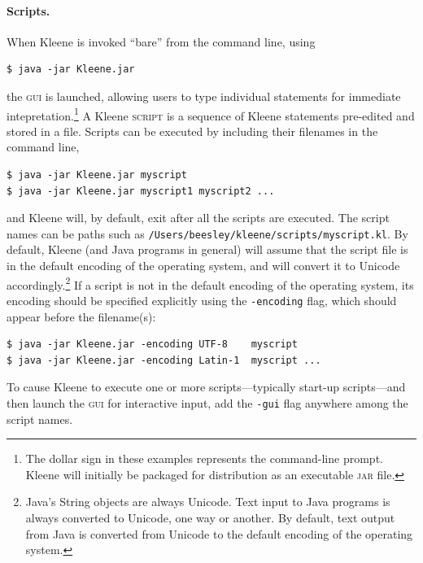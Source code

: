 \documentclass[letterpaper,12pt]{article}
\newcommand{\acro}{\textsc}
\begin{document}
\paragraph{Scripts.}

When Kleene is invoked ``bare'' from the command line, using

\begin{Verbatim}[fontsize=\small]
$ java -jar Kleene.jar
\end{Verbatim}

\noindent
the \acro{gui} is launched, allowing users to type individual statements
for immediate intepretation.\footnote{The dollar sign in these examples
	represents the command-line prompt.  Kleene will initially be
	packaged for distribution as an executable \acro{jar} file.} A Kleene
	\acro{script} is a sequence of Kleene statements pre-edited and
	stored in a file.  Scripts can be executed by including their
	filenames in the command line,

\begin{Verbatim}[fontsize=\small]
$ java -jar Kleene.jar myscript
$ java -jar Kleene.jar myscript1 myscript2 ...
\end{Verbatim}

\noindent
and Kleene will, by default, exit after all the scripts are executed.
The script names can be paths such as
\texttt{/Users/beesley/kleene/scripts/myscript.kl}.  By default, Kleene
(and Java programs in general) will assume that the script file is in the
default encoding of the operating system, and will convert it to Unicode
accordingly.\footnote{Java's String objects are always Unicode.  Text
input to Java programs is always converted to Unicode, one way or
another.  By default, text output from Java is converted from Unicode to
the default encoding of the operating system.}  If a script is not in the
default encoding of the operating system, its encoding should be specified
explicitly using the \texttt{-encoding} flag, which should appear before
the filename(s):

\begin{Verbatim}[fontsize=\small]
$ java -jar Kleene.jar -encoding UTF-8    myscript
$ java -jar Kleene.jar -encoding Latin-1  myscript ...
\end{Verbatim}

\noindent
To cause Kleene to execute one or more scripts---typically start-up
scripts---and then launch the \acro{gui} for interactive input, add the
\texttt{-gui} flag anywhere among the script names.
\end{document}
